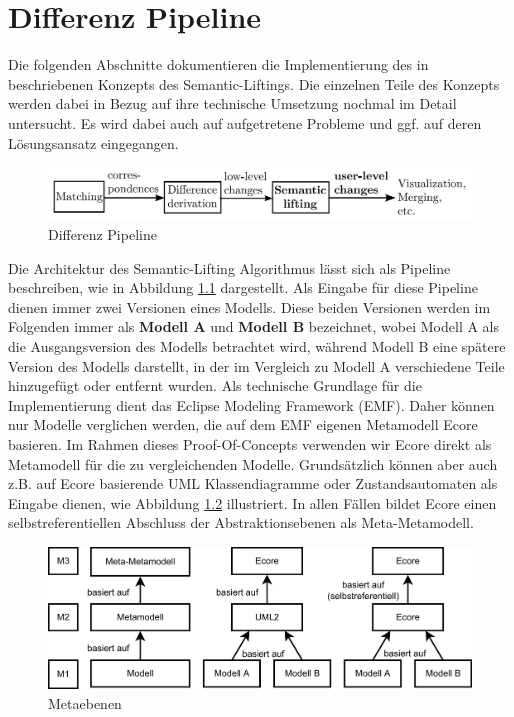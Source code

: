 \chapter{Differenz Pipeline}
\label{diffPipe}

Die folgenden Abschnitte dokumentieren die Implementierung des in \cite{KeKT2011ASE} beschriebenen
Konzepts des Semantic-Liftings. Die einzelnen Teile des Konzepts werden dabei in Bezug auf
ihre technische Umsetzung nochmal im Detail untersucht. Es wird dabei auch auf aufgetretene Probleme
und ggf. auf deren Lösungsansatz eingegangen.

\begin{figure}[htbp]
  \centering
  \includegraphics[scale=0.2]{images/difference_pipeline.png}
  \caption{Differenz Pipeline \cite{KeKT2011ASE}}
  \label{fig:diff_pipeline}
\end{figure}

Die Architektur des Semantic-Lifting Algorithmus lässt sich als Pipeline beschreiben, wie in
Abbildung \ref{fig:diff_pipeline} dargestellt. Als Eingabe für diese Pipeline dienen immer zwei
Versionen eines Modells. Diese beiden Versionen werden im Folgenden immer als \textbf{Modell A} und
\textbf{Modell B} bezeichnet, wobei Modell A  als die Ausgangsversion des Modells betrachtet wird,
während Modell B eine spätere Version des Modells darstellt, in der im Vergleich zu Modell A
verschiedene Teile hinzugefügt oder entfernt wurden. Als technische Grundlage für die
Implementierung dient das Eclipse Modeling Framework (EMF). Daher können nur Modelle verglichen
werden, die auf dem EMF eigenen Metamodell Ecore basieren. Im Rahmen dieses Proof-Of-Concepts
verwenden wir Ecore direkt als Metamodell für die zu vergleichenden Modelle. Grundsätzlich können
aber auch z.B. auf Ecore basierende UML Klassendiagramme oder Zustandsautomaten als Eingabe dienen,
wie Abbildung \ref{fig:metaebenen} illustriert. In allen Fällen bildet Ecore einen
selbstreferentiellen Abschluss der Abstraktionsebenen als Meta-Metamodell.

\begin{figure}[htbp]
  \centering
  \includegraphics[width=1.0\textwidth]{images/metaebenen.png}
  \caption{Metaebenen}
  \label{fig:metaebenen}
\end{figure}

